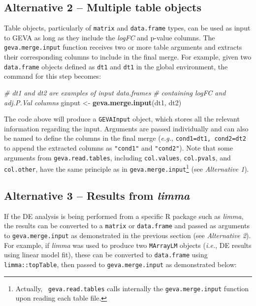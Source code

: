 \documentclass[
  12pt,
]{article}
\newenvironment{Shaded}{\begin{snugshade}}{\end{snugshade}}
\newcommand{\CommentTok}[1]{\textcolor[rgb]{0.56,0.35,0.01}{\textit{#1}}}
\newcommand{\KeywordTok}[1]{\textcolor[rgb]{0.13,0.29,0.53}{\textbf{#1}}}
\newcommand{\NormalTok}[1]{#1}
\newcommand{\StringTok}[1]{\textcolor[rgb]{0.31,0.60,0.02}{#1}}
\begin{document}
\hypertarget{alternative-2-multiple-table-objects}{%
\subsection{Alternative 2 -- Multiple table
objects}\label{alternative-2-multiple-table-objects}}

Table objects, particularly of \texttt{matrix} and \texttt{data.frame}
types, can be used as input to GEVA as long as they include the
\emph{logFC} and p-value columns. The \texttt{geva.merge.input} function
receives two or more table arguments and extracts their corresponding
columns to include in the final merge. For example, given two
\texttt{data.frame} objects defined as \texttt{dt1} and \texttt{dt1} in
the global environment, the command for this step becomes:

\begin{Shaded}
\begin{Highlighting}[]
\CommentTok{# dt1 and dt2 are examples of input data.frames}
\CommentTok{# containing logFC and adj.P.Val columns}
\NormalTok{ginput <-}\StringTok{ }\KeywordTok{geva.merge.input}\NormalTok{(dt1, dt2)}
\end{Highlighting}
\end{Shaded}

The code above will produce a \texttt{GEVAInput} object, which stores
all the relevant information regarding the input. Arguments are passed
individually and can also be named to define the columns in the final
merge (\emph{e.g.}, \texttt{cond1=dt1,\ cond2=dt2} to append the
extracted columns as \texttt{"cond1"} and \texttt{"cond2"}). Note that
some arguments from \texttt{geva.read.tables}, including
\texttt{col.values}, \texttt{col.pvals}, and \texttt{col.other}, have
the same principle as in
\texttt{geva.merge.input}\footnote{Actually, \texttt{ geva.read.tables} calls internally the \texttt{geva.merge.input} function upon reading each table file.}
(see \emph{Alternative 1}).

\hypertarget{alternative-3-results-from-limma}{%
\subsection{\texorpdfstring{Alternative 3 -- Results from
\emph{limma}}{Alternative 3 -- Results from limma}}\label{alternative-3-results-from-limma}}

If the DE analysis is being performed from a specific R package such as
\emph{limma}, the results can be converted to a \texttt{matrix} or
\texttt{data.frame} and passed as arguments to \texttt{geva.merge.input}
as demonstrated in the previous section (see \emph{Alternative 2}). For
example, if \emph{limma} was used to produce two \texttt{MArrayLM}
objects (\emph{i.e.}, DE results using linear model fit), these can be
converted to \texttt{data.frame} using \texttt{limma::topTable}, then
passed to \texttt{geva.merge.input} as demonstrated below:
\end{document}
